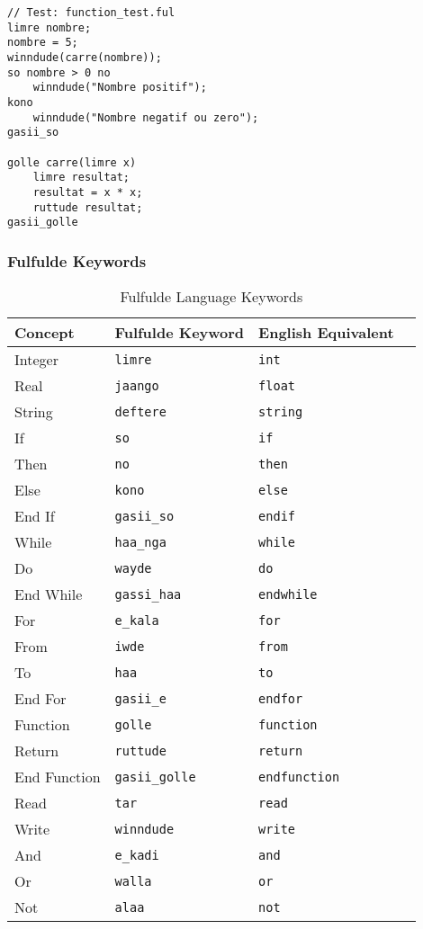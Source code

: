\documentclass[12pt,a4paper]{article}
\begin{document}
\begin{lstlisting}[language=Fulfulde, caption={Example Fulfulde Program}, label={lst:fulfulde-example}]
// Test: function_test.ful
limre nombre;
nombre = 5;
winndude(carre(nombre));
so nombre > 0 no
    winndude("Nombre positif");
kono
    winndude("Nombre negatif ou zero");
gasii_so

golle carre(limre x)
    limre resultat;
    resultat = x * x;
    ruttude resultat;
gasii_golle

\end{lstlisting}

\subsubsection{Fulfulde Keywords}

\begin{table}[htbp]
\centering
\caption{Fulfulde Language Keywords}
\label{tab:fulfulde-keywords}
\begin{tabular}{@{}llll@{}}
\toprule
\textbf{Concept} & \textbf{Fulfulde Keyword} & \textbf{English Equivalent} \\
\midrule
Integer & \texttt{limre} & \texttt{int} \\
Real & \texttt{jaango} & \texttt{float} \\
String & \texttt{deftere} & \texttt{string} \\
If & \texttt{so} & \texttt{if} \\
Then & \texttt{no} & \texttt{then} \\
Else & \texttt{kono} & \texttt{else} \\
End If & \texttt{gasii\_so} & \texttt{endif} \\
While & \texttt{haa\_nga} & \texttt{while} \\
Do & \texttt{wayde} & \texttt{do} \\
End While & \texttt{gassi\_haa} & \texttt{endwhile} \\
For & \texttt{e\_kala} & \texttt{for} \\
From & \texttt{iwde} & \texttt{from} \\
To & \texttt{haa} & \texttt{to} \\
End For & \texttt{gasii\_e} & \texttt{endfor} \\
Function & \texttt{golle} & \texttt{function} \\
Return & \texttt{ruttude} & \texttt{return} \\
End Function & \texttt{gasii\_golle} & \texttt{endfunction} \\
Read & \texttt{tar} & \texttt{read} \\
Write & \texttt{winndude} & \texttt{write} \\
And & \texttt{e\_kadi} & \texttt{and} \\
Or & \texttt{walla} & \texttt{or} \\
Not & \texttt{alaa} & \texttt{not} \\
\bottomrule
\end{tabular}
\end{table}
\end{document}
